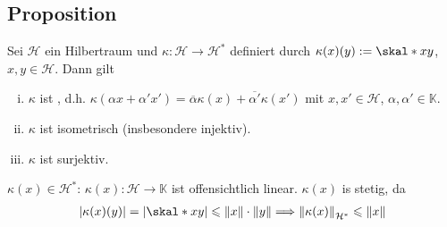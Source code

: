 \subsection{Proposition} %
\label{sub:711}
Sei $\mathcal{H}$ ein Hilbertraum und $\kappa : \mathcal{H} \to \mathcal{H}^*$ definiert durch $\kappa(x)(y) := \skal*{x}{y}$, $x,y \in \mathcal{H}$. Dann gilt
\begin{enumerate}[(i)]
	\item $\kappa$ ist , d.h. $\kappa(\alpha x+ \alpha' x') = \overline{\alpha} \kappa(x) + \overline{\alpha'}\kappa(x')$ mit $x,x' \in \mathcal{H}$, 
	$\alpha, \alpha' \in \mathds{K}$.
	\item $\kappa$ ist isometrisch (insbesondere injektiv).
	\item $\kappa$ ist surjektiv.
\end{enumerate}
$\kappa(x) \in \mathcal{H}^*$: $\kappa(x) \colon \mathcal{H} \to \mathds{K}$ ist offensichtlich linear. $\kappa(x)$ is stetig, da
\begin{align*}
	\abs*{\kappa(x)(y)}= \abs*{\skal*{x}{y}}  \le \norm{x} \cdot \norm{y}  \Longrightarrow \norm[\mathcal{H}^*]{\kappa(x)} \le \norm{x}  
\end{align*}
